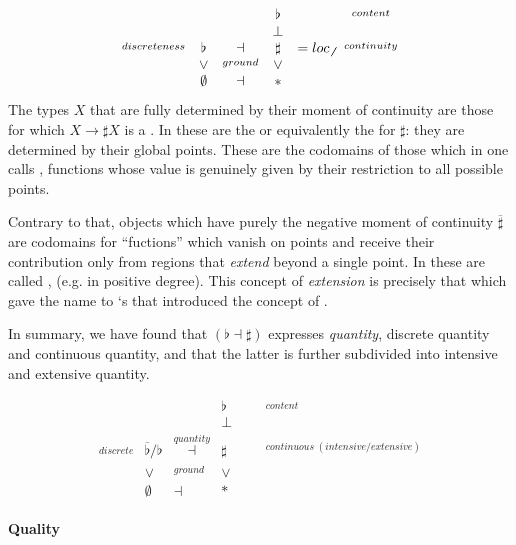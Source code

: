 \documentclass[12pt,titlepage]{article}
\newcommand{\itexarray}[1]{\begin{matrix}#1\end{matrix}}
\theoremstyle{plain}
\theoremstyle{definition}
\theoremstyle{remark}
\begin{document}
\begin{displaymath}
\itexarray{
     & && \flat && \stackrel{content}{}
     \\
     & && \bot &
     \\
     \stackrel{discreteness}{} & \flat &\dashv& \sharp & = loc_{\not \not}&  \stackrel{continuity}{}
     \\
     & \vee &\stackrel{ground}{}& \vee
     \\
     & \emptyset &\dashv& \ast &
  }
\end{displaymath}
The types $X$ that are fully determined by their moment of continuity are those for which $X \to \sharp X$ is a . In  these are the  or equivalently the  for $\sharp$: they are determined by their global points. These are the codomains of those  which in  one calls , functions whose value is genuinely given by their restriction to all possible points.

Contrary to that, objects which have purely the negative moment of continuity $\overline{\sharp}$ are codomains for ``fuctions'' which vanish on points and receive their contribution only from regions that \emph{extend} beyond a single point. In  these are called , (e.g.  in positive degree). This concept of \emph{extension} is precisely that which gave the name to `s  that introduced the concept of  .

In summary, we have found that $(\flat \dashv \sharp)$ expresses \emph{quantity}, discrete quantity and continuous quantity, and that the latter is further subdivided into intensive and extensive quantity.

\begin{displaymath}
\itexarray{
     & && \flat & && \stackrel{content}{}
     \\
     & && \bot & &&
     \\
     \stackrel{discrete}{} & \overline{\flat}/\flat &\stackrel{quantity}{\dashv}& \sharp &  &   & \stackrel{continuous\; (intensive/extensive)}{}
     \\
     & \vee &\stackrel{ground}{}& \vee
     \\
     & \emptyset &\dashv& \ast &
  }
\end{displaymath}
\hypertarget{quality}{}\paragraph*{{Quality}}\label{quality}
\end{document}
